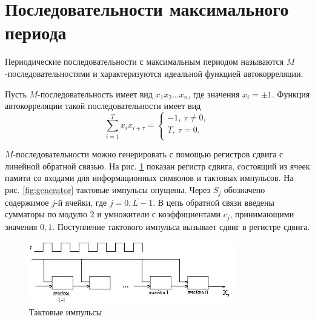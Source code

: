 \section{Последовательности максимального периода}
\label{section:max-seq}

Периодические последовательности с максимальным периодом называются $M$-последовательностями и характеризуются идеальной функцией автокорреляции.

Пусть $M$-последовательность имеет вид $x_1 x_2 \dots x_n$, где значения $x_{i} = \pm 1$. Функция автокорреляции такой последовательности имеет вид
\[
    \sum\limits_{i=1}^{T} x_i x_{i + \tau}  = \left\{ \begin{array}{l}
        -1, ~ \tau \neq 0, \\
        T, ~ \tau = 0. \\
    \end{array} \right.
\]

$M$-последовательности можно генерировать с помощью регистров сдвига с линейной обратной связью. На рис. \ref{fig:impulse} показан регистр сдвига, состоящий из ячеек памяти со входами для информационных символов и тактовых импульсов. На рис. \ref{fig:generator} тактовые импульсы опущены. Через $S_{j}$ обозначено содержимое $j$-й ячейки, где $j=\overline{0,L-1}$. В цепь обратной связи введены сумматоры по модулю 2 и умножители с коэффициентами $c_{j}$, принимающими значения $0,1$.  Поступление тактового импульса вызывает сдвиг в регистре сдвига.
\begin{figure}[h!]
	\centering
    \includegraphics[width=0.8\textwidth]{pic/taktovi-impuls}
    \caption{Тактовые импульсы\label{fig:impulse}}
\end{figure}

